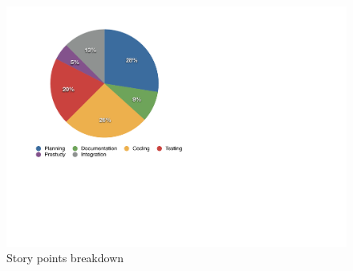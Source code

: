 \newpage

\begin{figure}[h!]
\centering \includegraphics[scale=0.8]{img/pie_chart.pdf}
\caption{Story points breakdown}
\label{fig:sprints-points}
\end{figure}
